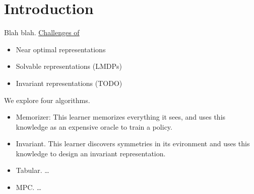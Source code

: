 \chapter{Introduction}\label{C:intro}

Blah blah. \href{https://arxiv.org/abs/1904.12901}{Challenges of}


\begin{itemize}
\tightlist
\item
  Near optimal representations
\item
  Solvable representations (LMDPs)
\item
  Invariant representations (TODO)
\end{itemize}


We explore four algorithms.

\begin{itemize}
\tightlist
\item
  Memorizer: This learner memorizes everything it sees, and uses this
  knowledge as an expensive oracle to train a policy.
\item
  Invariant. This learner discovers symmetries in its evironment and
  uses this knowledge to design an invariant representation.
\item
  Tabular. \ldots{}
\item
  MPC. \ldots{}
\end{itemize}
